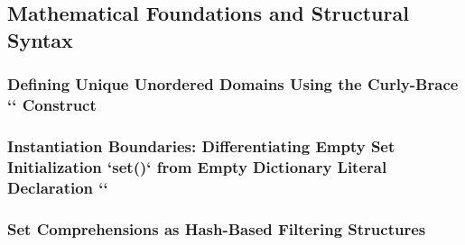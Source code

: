 \subsection{Mathematical Foundations and Structural Syntax}
\subsubsection{Defining Unique Unordered Domains Using the Curly-Brace `{}` Construct}
\subsubsection{Instantiation Boundaries: Differentiating Empty Set Initialization `set()` from Empty Dictionary Literal Declaration `{}`}
\subsubsection{Set Comprehensions as Hash-Based Filtering Structures}
